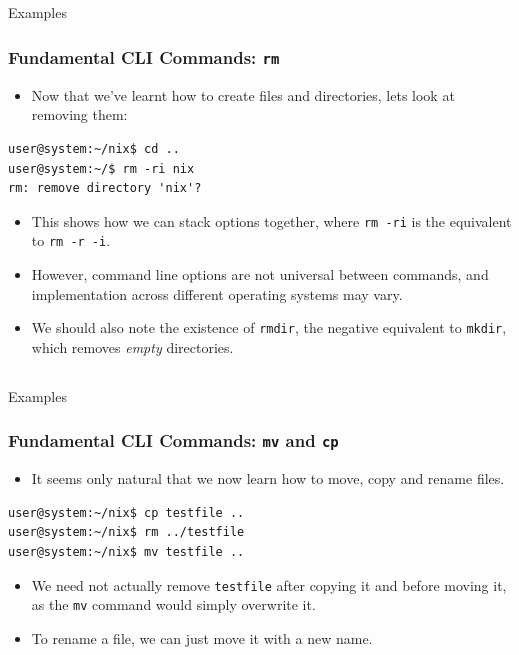 \documentclass[10pt]{beamer}
\begin{document}
\subsection{}
\begin{frame}[fragile]{Examples}
\frametitle{Fundamental CLI Commands: \texttt{rm}}
\begin{itemize}
\item Now that we've learnt how to create files and directories, lets look at removing them:
\end{itemize}
\begin{lstlisting}[style=BashInputStyle]
user@system:~/nix$ cd ..
user@system:~/$ rm -ri nix
rm: remove directory 'nix'?
\end{lstlisting}
\vspace{0.1in}
\begin{itemize}
\item This shows how we can stack options together, where \texttt{rm -ri} is the equivalent to \texttt{rm -r -i}. \vspace{0.1in}
\item  However, command line options are not universal between commands, and implementation across different operating systems may vary.\vspace{0.1in}
\item We should also note the existence of \texttt{rmdir}, the negative equivalent to \texttt{mkdir}, which removes \emph{empty} directories.
\end{itemize}
\end{frame}

\subsection{}
\begin{frame}[fragile]{Examples}
\frametitle{Fundamental CLI Commands: \texttt{mv} and \texttt{cp}}
\begin{itemize}
\item It seems only natural that we now learn how to move, copy and rename files.
\end{itemize}
\begin{lstlisting}[style=BashInputStyle]
user@system:~/nix$ cp testfile ..
user@system:~/nix$ rm ../testfile
user@system:~/nix$ mv testfile ..
\end{lstlisting}
\vspace{0.1in}
\begin{itemize}
\item We need not actually remove \texttt{testfile} after copying it and before moving it, as the \texttt{mv} command would simply overwrite it.\vspace{0.1in}
\item To rename a file, we can just move it with a new name. 
\end{itemize}
\end{frame}
\end{document}
